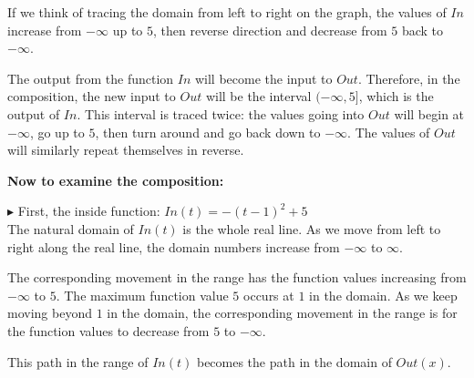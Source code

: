 \documentclass{ximera}
\begin{document}
If we think of tracing the domain from left to right on the graph, the values of $In$ increase from $-\infty$ up to $5$, then reverse direction and decrease from $5$ back to $-\infty$.


The output from the function $In$ will become the input to $Out$.  Therefore, in the composition, the new input to $Out$ will be the interval $(-\infty, 5]$, which is the output of $In$. This interval is traced twice: the values going into $Out$ will begin at $-\infty$, go up to $5$, then turn around and go back down to $-\infty$. The values of $Out$ will similarly repeat themselves in reverse.






\textbf{\textcolor{purple!85!blue}{Now to examine the composition:}} 



\textbf{\textcolor{blue!75!black}{$\blacktriangleright$}}   First, the inside function: $In(t) = -(t-1)^2 + 5$ \\

The natural domain of $In(t)$ is the whole real line. As we move from left to right along the real line, the domain numbers increase from $-\infty$ to $\infty$.

The corresponding movement in the range has the function values increasing from $-\infty$ to $5$.  The maximum function value $5$ occurs at $1$ in the domain.  As we keep moving beyond $1$ in the domain, the corresponding movement in the range is for the function values to decrease from $5$ to $-\infty$.


This path in the range of $In(t)$ becomes the path in the domain of $Out(x)$. 
\end{document}
